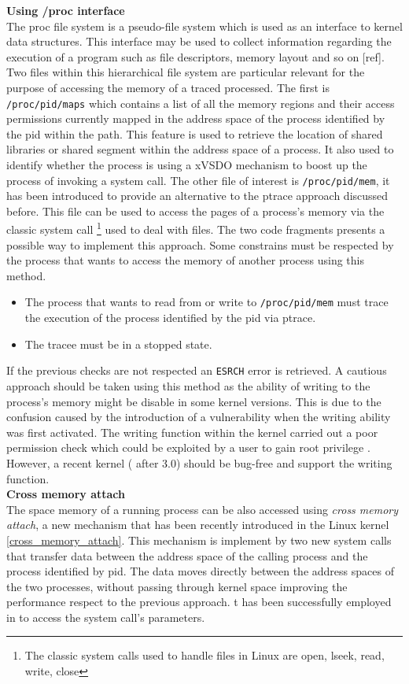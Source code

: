 \textbf{ Using /proc interface} \\
The proc file system is a pseudo-file system which is used as an interface to kernel data structures. This interface may be used to collect information regarding the execution of a program such as file descriptors, memory layout and so on [ref]. Two files within this hierarchical file system are particular relevant for the purpose of accessing the memory of a traced processed. The first is \lstinline$/proc/pid/maps$ which contains a list of all the memory regions and their access permissions currently mapped in the address space of the process identified by the pid within the path. This feature is used to retrieve the location of shared libraries or shared segment within the address space of a process. It also used to identify whether the process is using a xVSDO mechanism to boost up the process of invoking a system call. The other file of interest is \lstinline$/proc/pid/mem$, it has been introduced to provide an alternative to the ptrace approach discussed before. This file can be used to access the pages of a process's memory via the classic system call  \footnote{The classic system calls used to handle files in Linux are open, lseek, read, write, close} used to deal with files. The two code fragments presents a possible way to implement this approach. Some constrains must be respected by the process that wants to access the memory of another process using this method.
\begin{itemize}
\item  The process that wants to read from or write to \lstinline$/proc/pid/mem$ must trace the execution of the process identified by the pid via ptrace.
\item  The tracee must be in a stopped state.  
\end{itemize} 
If the previous checks are not respected an \lstinline$ESRCH$ error is retrieved. A cautious approach should be taken using this method as the ability of writing to the process's memory might be disable in some kernel versions. This is due to the confusion caused by the introduction of a vulnerability when the writing ability was first activated. The writing function within the kernel carried out a poor permission check which could be exploited by a user to gain root privilege \cite{mem_vul}. However, a recent kernel ( after 3.0) should be bug-free and support the writing function. \\
 
\textbf{Cross memory attach}\\
The space memory of a running process can be also accessed using \emph{cross memory attach}, a new mechanism that has been recently introduced in the Linux kernel
 \ref{cross_memory_attach}. This mechanism is implement by two new system calls \cite{cross memory attach_syscall} that transfer data between the address space of the calling process and the process identified by pid.  The data moves directly between the address spaces of the two processes, without passing through kernel space improving the performance respect to the previous  approach. t has been successfully employed in \cite{mx:icse13} to access the system call's parameters. 
 
